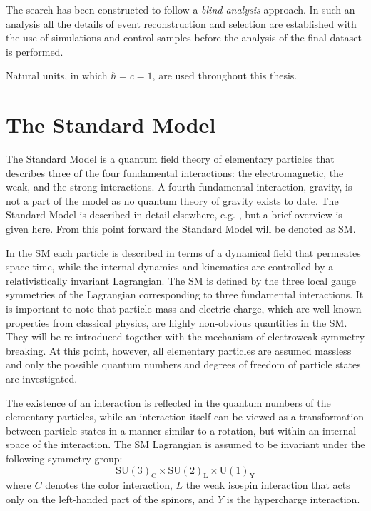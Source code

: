 
The search has been constructed to follow a {\it blind analysis} approach. In such an analysis
all the details of event reconstruction and selection are established 
with the use of simulations and control samples before
the analysis of the final dataset is performed.

Natural units, in which $\hbar=c=1$, are used throughout this thesis.


\section{The Standard Model}

The Standard Model is a quantum field theory of elementary particles that describes 
three of the four fundamental interactions: 
the electromagnetic, the weak, and the strong interactions. A fourth fundamental
interaction, gravity, 
is not a part of the model as no quantum theory of gravity exists to date. 
The Standard Model is described in detail elsewhere, e.g. \cite{Glashow:1961tr,Salam:1968rm,Tully:1417476}, 
but a brief overview is given here. From this point forward the Standard Model will be denoted as SM.

In the SM each particle is described
in terms of a dynamical field that permeates space-time, while the internal dynamics 
and kinematics are controlled by a relativistically invariant Lagrangian.
The SM is defined by the three local gauge symmetries of the Lagrangian
corresponding to three fundamental interactions.
It is important to note that particle mass and electric charge, 
which are well known properties from 
classical physics, are highly non-obvious quantities in the SM. They
will be re-introduced together with the mechanism of electroweak symmetry breaking. At this point, however,
all elementary particles are assumed massless and only the possible quantum numbers
and degrees of freedom of particle states are investigated.

The existence of an interaction is reflected in the quantum numbers of the elementary
particles, while an interaction itself can be viewed as a transformation between particle states
in a manner similar to a rotation, but within an internal space of the interaction.
The SM Lagrangian is assumed to be invariant under the following symmetry group:
\begin{equation}
\text{SU}(3)_\text{C} \times \text{SU}(2)_\text{L} \times \text{U}(1)_\text{Y}
\label{eqn:symSM}
\end{equation}
where $C$ denotes the color interaction, $L$ the weak isospin interaction 
that acts only on the left-handed part of the spinors, and $Y$ is the hypercharge
interaction.

